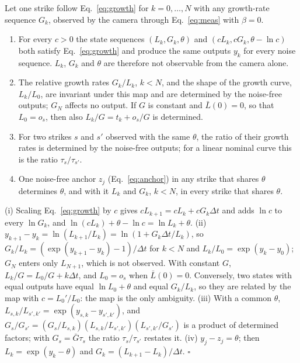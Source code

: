 \begin{lemma}\label{lem:scale}
Let one strike follow Eq.~\eqref{eq:growth} for $k = 0, \dots, N$ with any growth-rate sequence $G_k$, observed by the
camera through Eq.~\eqref{eq:meas} with $\beta = 0$.
\begin{enumerate}
\item[(i)] For every $c > 0$ the state sequences $(L_k, G_k, \theta)$ and $(c L_k, c G_k, \theta - \ln c)$ both satisfy
Eq.~\eqref{eq:growth} and produce the same outputs $y_k$ for every noise sequence. $L_k$, $G_k$ and $\theta$ are
therefore not observable from the camera alone.
\item[(ii)] The relative growth rates $G_k / L_k$, $k < N$, and the shape of the growth curve, $L_k / L_0$, are
invariant under this map and are determined by the noise-free outputs; $G_N$ affects no output. If $G$ is constant
and $\bar L(0) = 0$, so that $L_0 = o_s$, then also $L_k/G = t_k + o_s/G$ is determined.
\item[(iii)] For two strikes $s$ and $s'$ observed with the same $\theta$, the ratio of their growth rates is determined
by the noise-free outputs; for a linear nominal curve this is the ratio $\tau_s / \tau_{s'}$.
\item[(iv)] One noise-free anchor $z_j$ (Eq.~\ref{eq:anchor}) in any strike that shares $\theta$ determines $\theta$,
and with it $L_k$ and $G_k$, $k < N$, in every strike that shares $\theta$.
\end{enumerate}
\end{lemma}

\begin{pf}
(i) Scaling Eq.~\eqref{eq:growth} by $c$ gives $c L_{k+1} = c L_k + c G_k \Delta t$ and adds $\ln c$ to every
$\ln G_k$, and $\ln(c L_k) + \theta - \ln c = \ln L_k + \theta$. (ii) $y_{k+1} - y_k = \ln(L_{k+1}/L_k) = \ln(1 + G_k
\Delta t / L_k)$, so $G_k/L_k = (\exp(y_{k+1} - y_k) - 1)/\Delta t$ for $k < N$ and $L_k/L_0 = \exp(y_k - y_0)$; $G_N$
enters only $L_{N+1}$, which is not observed. With constant $G$, $L_k/G = L_0/G + k\Delta t$, and $L_0 = o_s$ when
$\bar L(0) = 0$. Conversely, two states with equal outputs have equal $\ln L_0 + \theta$ and equal $G_k/L_k$, so they
are related by the map with $c = L_0'/L_0$: the map is the only ambiguity. (iii) With a common $\theta$,
$L_{s,k}/L_{s',k'} = \exp(y_{s,k} - y_{s',k'})$, and $G_s/G_{s'} = (G_s/L_{s,k})(L_{s,k}/L_{s',k'})(L_{s',k'}/G_{s'})$
is a product of determined factors; with $G_s = \bar G \tau_s$ the ratio $\tau_s/\tau_{s'}$ restates it. (iv)
$y_j - z_j = \theta$; then $L_k = \exp(y_k - \theta)$ and $G_k = (L_{k+1} - L_k)/\Delta t$. \hfill$\square$
\end{pf}


